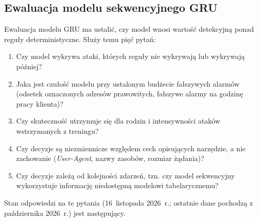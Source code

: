 \documentclass[a4paper,12pt]{article}
\begin{document}
\subsection{Ewaluacja modelu sekwencyjnego GRU}\label{sec:wyniki_gru}
Ewaluacja modelu GRU ma ustalić, czy model wnosi wartość detekcyjną ponad reguły deterministyczne. Służy temu pięć pytań:
\begin{enumerate}
    \item[G1.] Czy model wykrywa ataki, których reguły nie wykrywają lub wykrywają później?
    \item[G2.] Jaka jest czułość modelu przy ustalonym budżecie fałszywych alarmów (odsetek oznaczonych adresów prawowitych, fałszywe alarmy na godzinę pracy klienta)?
    \item[G3.] Czy skuteczność utrzymuje się dla rodzin i intensywności ataków wstrzymanych z treningu?
    \item[G4.] Czy decyzje są niezmiennicze względem cech opisujących narzędzie, a nie zachowanie (\textit{User-Agent}, nazwy zasobów, rozmiar żądania)?
    \item[G5.] Czy decyzje zależą od kolejności zdarzeń, tzn. czy model sekwencyjny wykorzystuje informację niedostępną modelowi tabelarycznemu?
\end{enumerate}

Stan odpowiedzi na te pytania (16~listopada 2026~r.; ostatnie dane pochodzą z października 2026~r.) jest następujący.
\end{document}
